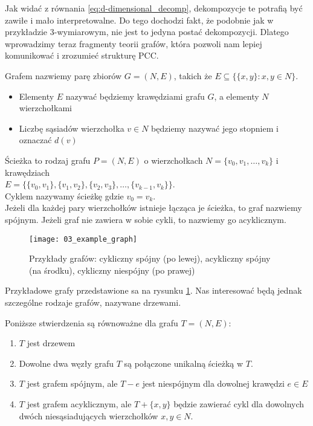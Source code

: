Jak widać z równania \ref{eq:d-dimensional_decomp}, dekompozycje te potrafią być zawiłe i mało interpretowalne. Do tego dochodzi fakt, że podobnie jak w przykładzie 3-wymiarowym, nie jest to jedyna postać dekompozycji. Dlatego wprowadzimy teraz fragmenty teorii grafów, która pozwoli nam lepiej komunikować i zrozumieć strukturę PCC.

\begin{df}
	Grafem nazwiemy parę zbiorów $G= (N, E)$, takich że $E \subseteq \{ \{x,y \}: x,y \in N \}$.
	\begin{itemize}
		\item Elementy $E$ nazywać będziemy krawędziami grafu $G$, a elementy $N$ wierzchołkami
		\item Liczbę sąsiadów wierzchołka $v\in N$ będziemy nazywać jego stopniem i oznaczać $d(v)$
	\end{itemize}
\end{df}

\begin{df}
	Ścieżka to rodzaj grafu $P = (N, E)$ o wierzchołkach $N = \{ v_0, v_1, \dots, v_k\}$ i krawędziach \\ $E = \{ \{v_0, v_1 \}, \{v_1, v_2 \}, \{v_2, v_3 \}, \dots, \{v_{k-1}, v_k \} \}$.\\
	Cyklem nazywamy ścieżkę gdzie $v_0=v_k$.\\
	Jeżeli dla każdej pary wierzchołków istnieje łącząca je ścieżka, to graf nazwiemy spójnym. Jeżeli graf nie zawiera w sobie cykli, to nazwiemy go acyklicznym. 
\end{df}

\begin{figure}[h]
	\centering
	\texttt{[image: 03\_example\_graph]}
	
	\caption{Przykłady grafów: cykliczny spójny (po lewej), acykliczny spójny (na środku), cykliczny niespójny (po prawej)\label{fig:example_graph}}
\end{figure}

Przykładowe grafy przedstawione sa na rysunku \ref{fig:example_graph}. Nas interesować będą jednak szczególne rodzaje grafów, nazywane drzewami.
\begin{df}
	Poniższe stwierdzenia są równoważne dla grafu $T = (N, E)$:
	\begin{enumerate}
		\item $T$ jest drzewem
		\item Dowolne dwa węzły grafu $T$ są połączone unikalną ścieżką w $T$.
		\item $T$ jest grafem spójnym, ale $T-e$ jest niespójnym dla dowolnej krawędzi $e\in E$
		\item $T$ jest grafem acyklicznym, ale $T +\{x,y\}$ będzie zawierać cykl dla dowolnych dwóch niesąsiadujących wierzchołków $x, y \in N$.
	\end{enumerate}
\end{df}

